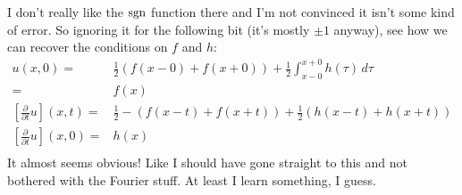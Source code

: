 I don't really like the $\operatorname{sgn}$ function there and I'm not convinced it isn't some kind of error. 
So ignoring it for the following bit (it's mostly $\pm 1$ anyway),
see how we can recover the conditions on $f$ and $h$:
\begin{equation*}
\begin{aligned}
	u(x,0) =&  \frac{1}{2}(f(x-0)+f(x+0)) + \frac{1}{2}\int_{x-0}^{x+0}h(\tau)\,d\tau \\
	=& f(x) \\
	\left[\frac{\partial}{\partial t}u\right](x,t) =&  \frac{1}{2}-(f(x-t)+f(x+t)) + \frac{1}{2}(h(x-t)+h(x+t)) \\
	\left[\frac{\partial}{\partial t}u\right](x,0) =&  h(x) \\
\end{aligned}
\end{equation*}
It almost seems obvious! 
Like I should have gone straight to this and not bothered with the Fourier stuff.
At least I learn something, I guess.
